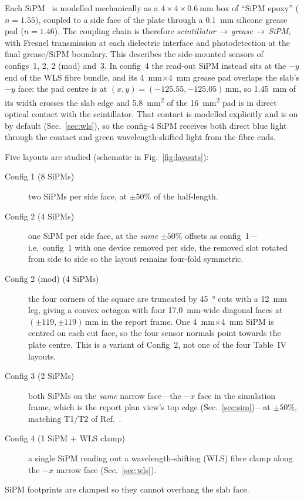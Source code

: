 \documentclass[11pt,a4paper]{article}
\begin{document}
Each SiPM~\cite{Gundacker2020} is modelled mechanically as a
$4 \times 4 \times \SI{0.6}{\milli\meter}$ box of ``SiPM epoxy'' ($n = 1.55$),
coupled to a side face of the plate through a
\SI{0.1}{\milli\meter} silicone grease pad ($n = 1.46$). The coupling chain is
therefore \emph{scintillator\,$\to$\,grease\,$\to$\,SiPM}, with Fresnel
transmission at each dielectric interface and photodetection at the final
grease/SiPM boundary. This describes the side-mounted sensors of
configs~1, 2, 2 (mod) and~3.
In config~4 the read-out SiPM instead sits at the $-y$ end of the WLS fibre
bundle, and its \SI{4}{\milli\meter}$\times$\SI{4}{\milli\meter} grease pad
overlaps the slab's $-y$ face: the pad centre is at
$(x,y)=(-125.55,-125.05)\,\si{\milli\meter}$, so \SI{1.45}{\milli\meter} of its
width crosses the slab edge and \SI{5.8}{\milli\meter\squared} of the
\SI{16}{\milli\meter\squared} pad is in direct optical contact with the
scintillator. That contact is modelled explicitly and is on by default
(Sec.~\ref{sec:wls}), so the config-4 SiPM receives both direct blue light
through the contact and green wavelength-shifted light from the fibre ends.

Five layouts are studied (schematic in Fig.~\ref{fig:layouts}):
\begin{description}
  \item[Config 1 (8 SiPMs)] two SiPMs per side face, at $\pm 50\%$ of the half-length.
  \item[Config 2 (4 SiPMs)] one SiPM per side face, at the \emph{same} $\pm 50\%$
        offsets as config~1---i.e.\ config~1 with one device removed per side,
        the removed slot rotated from side to side so the layout remains
        four-fold symmetric.
  \item[Config 2 (mod) (4 SiPMs)] the four corners of the square are truncated
        by \SI{45}{\degree} cuts with a \SI{12}{\milli\meter} leg, giving a convex
        octagon with four \SI{17.0}{\milli\meter}-wide diagonal faces at
        $(\pm119,\pm119)\,\si{\milli\meter}$ in the report frame. One
        \SI{4}{\milli\meter}$\times$\SI{4}{\milli\meter} SiPM is centred on each
        cut face, so the four sensor normals point towards the plate centre.
        This is a variant of Config~2, not one of the four Table~IV layouts.
  \item[Config 3 (2 SiPMs)] both SiPMs on the \emph{same} narrow
        face---the $-x$ face in the simulation frame, which is the report
        plan view's top edge (Sec.~\ref{sec:sim})---at $\pm 50\%$, matching
        T1/T2 of Ref.~\cite{Rao2025}.
  \item[Config 4 (1 SiPM $+$ WLS clamp)] a single SiPM reading out a
        wavelength-shifting (WLS) fibre clamp along the $-x$ narrow face
        (Sec.~\ref{sec:wls}).
\end{description}
SiPM footprints are clamped so they cannot overhang the slab face.
\end{document}

